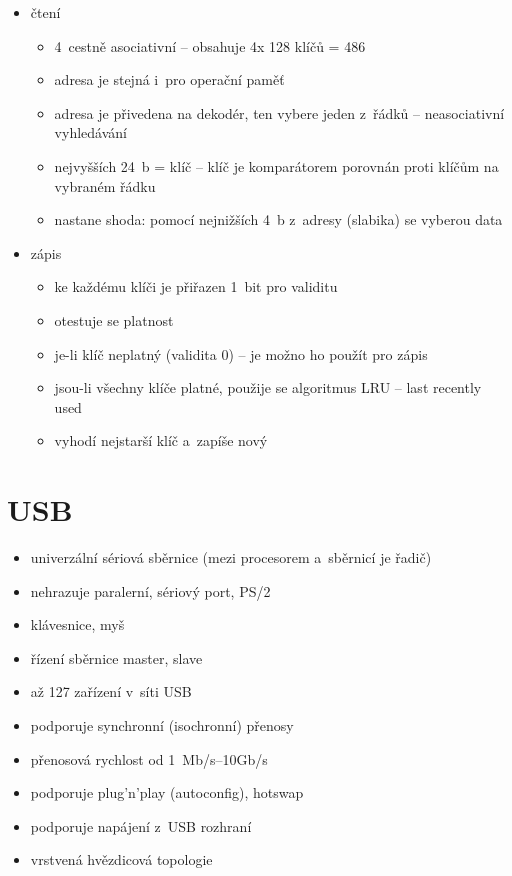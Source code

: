 \documentclass[a4paper,12pt]{article}
\providecommand{\tightlist}{%
\setlength{\itemsep}{0pt}\setlength{\parskip}{0pt}}
\begin{document}
\begin{itemize}
  \tightlist
  \item čtení
  \begin{itemize}
    \tightlist
    \item 4~cestně asociativní -- obsahuje 4x 128 klíčů = 486
    \item adresa je stejná i~pro operační paměť
    \item adresa je přivedena na dekodér, ten vybere jeden z~řádků --
    neasociativní vyhledávání
    \item nejvyšších 24~b = klíč -- klíč je komparátorem porovnán proti klíčům
    na vybraném řádku
    \item nastane shoda: pomocí nejnižších 4~b z~adresy (slabika) se vyberou data
  \end{itemize}
  \item zápis
  \begin{itemize}
    \tightlist
    \item ke každému klíči je přiřazen 1~bit pro validitu
    \item otestuje se platnost
    \item je-li klíč neplatný (validita 0) -- je možno ho použít pro zápis
    \item jsou-li všechny klíče platné, použije se algoritmus LRU -- last
    recently used
    \item vyhodí nejstarší klíč a~zapíše nový
  \end{itemize}
\end{itemize}

\section{USB}

\begin{itemize}
  \tightlist
  \item univerzální sériová sběrnice (mezi procesorem a~sběrnicí je řadič)
  \item nehrazuje paralerní, sériový port, PS/2
  \item klávesnice, myš
  \item řízení sběrnice master, slave
  \item až 127 zařízení v~síti USB
  \item podporuje synchronní (isochronní) přenosy
  \item přenosová rychlost od 1~Mb/s--10Gb/s
  \item podporuje plug'n'play (autoconfig), hotswap
  \item podporuje napájení z~USB rozhraní
  \item vrstvená hvězdicová topologie
\end{itemize}
\end{document}
